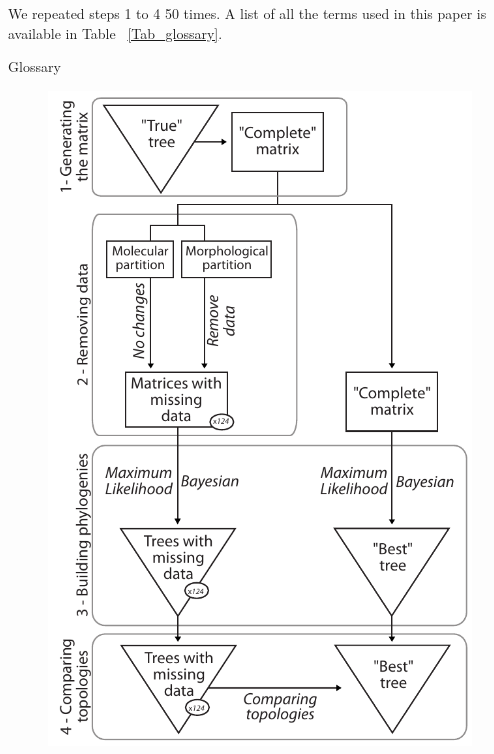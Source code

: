 \documentclass[12pt,letterpaper]{article}
\begin{document}
We repeated steps 1 to 4 50 times. %
A list of all the terms used in this paper is available in Table ~\ref{Tab_glossary}.


\begin{table}[ht]
  \caption{Glossary}
  \centering
  \linespread{1.0}
  \label{Tab_glossary}
\end{table}


\begin{figure}
\centering
\includegraphics[keepaspectratio=true]{Figures/TEM_Fig_outline-BW.pdf}

\end{figure}
\end{document}
